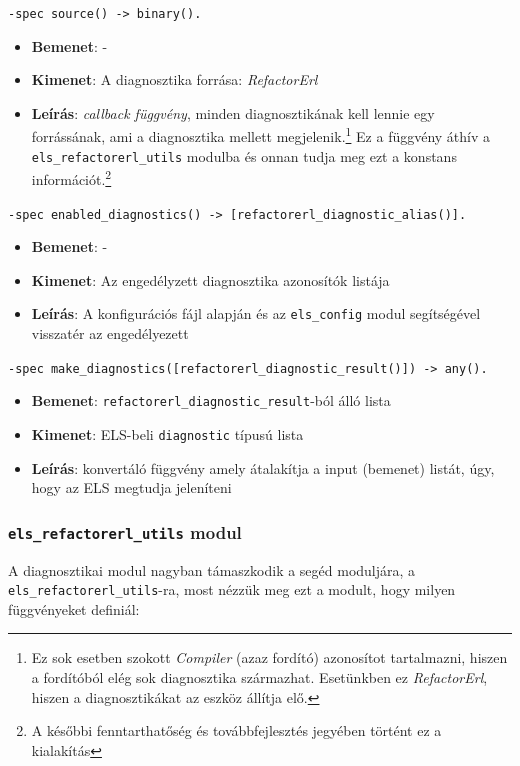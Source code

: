 \noindent \lstinline{-spec source() -> binary().}  
        \begin{itemize}
            \item \textbf{Bemenet}: -
            \item \textbf{Kimenet}: A diagnosztika forrása: \textit{RefactorErl}
            \item \textbf{Leírás}:  \textit{callback függvény}, minden diagnosztikának kell lennie egy forrássának, ami a diagnosztika mellett megjelenik.\footnote{Ez sok esetben szokott \textit{Compiler} (azaz fordító) azonosítot tartalmazni, hiszen a fordítóból elég sok diagnosztika származhat. Esetünkben ez \textit{RefactorErl}, hiszen a diagnosztikákat az eszköz állítja elő.} Ez a függvény áthív a \lstinline{els_refactorerl_utils} modulba és onnan tudja meg ezt a konstans információt.\footnote{A későbbi fenntarthatőség és továbbfejlesztés jegyében történt ez a kialakítás}
        \end{itemize}
    
   
\noindent \lstinline{-spec enabled_diagnostics() -> [refactorerl_diagnostic_alias()].} 
        \begin{itemize}
            \item \textbf{Bemenet}: -
            \item \textbf{Kimenet}: Az engedélyzett diagnosztika azonosítók listája
            \item \textbf{Leírás}:   A konfigurációs fájl alapján és az \lstinline{els_config} modul segítségével visszatér az engedélyezett 
        \end{itemize}
    
    
\noindent \lstinline{-spec make_diagnostics([refactorerl_diagnostic_result()]) -> any().} 
        \begin{itemize}
            \item \textbf{Bemenet}: \lstinline{refactorerl_diagnostic_result}-ból álló lista
            \item \textbf{Kimenet}: ELS-beli \lstinline{diagnostic} típusú lista
            \item \textbf{Leírás}: konvertáló függvény amely átalakítja a input (bemenet) listát, úgy, hogy az ELS megtudja jeleníteni
        \end{itemize}
    
  
\newpage

\subsubsection{\lstinline{els_refactorerl_utils} modul}
A diagnosztikai modul nagyban támaszkodik a segéd moduljára, a \lstinline{els_refactorerl_utils}-ra, most nézzük meg ezt a modult, hogy milyen függvényeket definiál:


